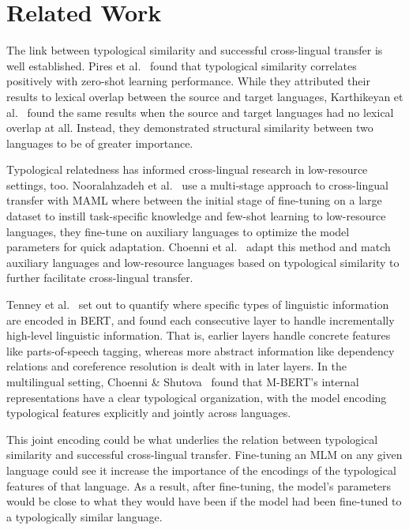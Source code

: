 
\section{Related Work}

The link between typological similarity and successful cross-lingual transfer is well established. Pires et al.~\cite{pires-etal-2019-multilingual} found that typological similarity correlates positively with zero-shot learning performance. While they attributed their results to lexical overlap between the source and target languages, Karthikeyan et al.~\cite{karthikeyan-etal-2020-cross} found the same results when the source and target languages had no lexical overlap at all. Instead, they demonstrated structural similarity between two languages to be of greater importance.

Typological relatedness has informed cross-lingual research in low-resource settings, too. Nooralahzadeh et al.~\cite{nooralahzadeh-etal-2020-zero} use a multi-stage approach to cross-lingual transfer with MAML where between the initial stage of fine-tuning on a large dataset to instill task-specific knowledge and few-shot learning to low-resource languages, they fine-tune on auxiliary languages to optimize the model parameters for quick adaptation. Choenni et al.~\cite{choenni-etal-2023-cross} adapt this method and match auxiliary languages and low-resource languages based on typological similarity to further facilitate cross-lingual transfer.

Tenney et al.~\cite{tenney-etal-2019-bert} set out to quantify where specific types of linguistic information are encoded in BERT, and found each consecutive layer to handle incrementally high-level linguistic information. That is, earlier layers handle concrete features like parts-of-speech tagging, whereas more abstract information like dependency relations and coreference resolution is dealt with in later layers. In the multilingual setting, Choenni \& Shutova~\cite{choenni-shutova-2022-investigating} found that M-BERT's internal representations have a clear typological organization, with the model encoding typological features explicitly and jointly across languages.

This joint encoding could be what underlies the relation between typological similarity and successful cross-lingual transfer. Fine-tuning an MLM on any given language could see it increase the importance of the encodings of the typological features of that language. As a result, after fine-tuning, the model's parameters would be close to what they would have been if the model had been fine-tuned to a typologically similar language.
